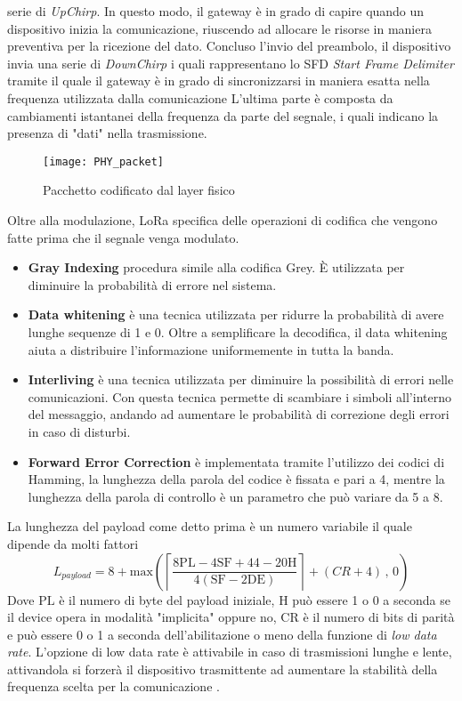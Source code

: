 serie di \emph{UpChirp}. In questo modo, il gateway è in grado di capire
quando un dispositivo inizia la comunicazione, riuscendo  ad
allocare le risorse in maniera preventiva per la ricezione del dato. 
Concluso l'invio del preambolo, il dispositivo invia  una serie di
\emph{DownChirp} i quali rappresentano lo SFD \emph{Start Frame Delimiter} tramite il quale il gateway è in
grado di sincronizzarsi in maniera esatta nella frequenza utilizzata dalla
comunicazione
L'ultima parte è composta da cambiamenti istantanei della frequenza da parte
del segnale, i quali indicano la presenza di "dati" nella trasmissione. 
\begin{figure}[ht]
        \centering 
                \texttt{[image: PHY\_packet]}
        \caption{Pacchetto codificato dal layer fisico}
        \label{fig:freq_lora_chirp}
\end{figure}
Oltre alla modulazione, LoRa specifica delle operazioni di codifica che vengono
fatte prima che il segnale venga modulato.
\begin{itemize}
        \item   \textbf{Gray Indexing} procedura simile alla codifica Grey. È
                utilizzata per diminuire la probabilità di errore nel sistema.
        \item   \textbf{Data whitening} è una tecnica utilizzata per ridurre la
                probabilità di avere lunghe sequenze di 1 e 0. Oltre a semplificare la
                decodifica, il data whitening aiuta a distribuire l'informazione 
                uniformemente in tutta la banda.
        \item   \textbf{Interliving} è una tecnica utilizzata per diminuire la
                possibilità di errori nelle comunicazioni. Con questa tecnica
                permette di scambiare i simboli all'interno del messaggio,
                andando ad aumentare le probabilità di correzione degli errori
                in caso di disturbi. 
        \item   \textbf{Forward Error Correction} è implementata tramite
                l'utilizzo dei codici di Hamming, la lunghezza della parola del codice è
                fissata e pari a 4, mentre la lunghezza della parola di
                controllo è un parametro che può variare da 5 a 8.
\end{itemize}
La lunghezza del payload come detto prima è un numero variabile il quale dipende
da molti fattori 
\begin{equation}
        L_{payload} = 8+
        \text{max}\left(\left\lceil\frac{8\text{PL}-4\text{SF}+44-20\text{H}}{4(\text{SF}-2\text{DE})}
        \right\rceil+(CR+4)\, , \, 0 \right)
\end{equation}
Dove $\text{PL}$ è il numero di byte del payload iniziale, $\text{H}$ può essere
1 o 0 a seconda se il device opera in modalità "implicita" oppure no,
$\text{CR}$ è il numero di bits di parità e  può essere 0 o 1 a seconda
dell'abilitazione o meno della funzione di \emph{low data rate}.
L'opzione di low data rate è attivabile in caso di trasmissioni lunghe e lente,
attivandola si forzerà il dispositivo trasmittente ad aumentare la stabilità
della frequenza scelta per la comunicazione .

